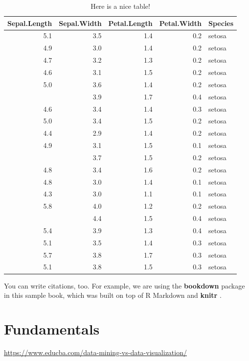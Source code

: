 \documentclass[]{book}
\theoremstyle{definition}
\theoremstyle{definition}
\theoremstyle{definition}
\theoremstyle{remark}
\begin{document}
\begin{table}

\caption{\label{tab:nice-tab}Here is a nice table!}
\centering
\begin{tabular}[t]{rrrrl}
\toprule
Sepal.Length & Sepal.Width & Petal.Length & Petal.Width & Species\\
\midrule
5.1 & 3.5 & 1.4 & 0.2 & setosa\\
4.9 & 3.0 & 1.4 & 0.2 & setosa\\
4.7 & 3.2 & 1.3 & 0.2 & setosa\\
4.6 & 3.1 & 1.5 & 0.2 & setosa\\
5.0 & 3.6 & 1.4 & 0.2 & setosa\\
\addlinespace
5.4 & 3.9 & 1.7 & 0.4 & setosa\\
4.6 & 3.4 & 1.4 & 0.3 & setosa\\
5.0 & 3.4 & 1.5 & 0.2 & setosa\\
4.4 & 2.9 & 1.4 & 0.2 & setosa\\
4.9 & 3.1 & 1.5 & 0.1 & setosa\\
\addlinespace
5.4 & 3.7 & 1.5 & 0.2 & setosa\\
4.8 & 3.4 & 1.6 & 0.2 & setosa\\
4.8 & 3.0 & 1.4 & 0.1 & setosa\\
4.3 & 3.0 & 1.1 & 0.1 & setosa\\
5.8 & 4.0 & 1.2 & 0.2 & setosa\\
\addlinespace
5.7 & 4.4 & 1.5 & 0.4 & setosa\\
5.4 & 3.9 & 1.3 & 0.4 & setosa\\
5.1 & 3.5 & 1.4 & 0.3 & setosa\\
5.7 & 3.8 & 1.7 & 0.3 & setosa\\
5.1 & 3.8 & 1.5 & 0.3 & setosa\\
\bottomrule
\end{tabular}
\end{table}

You can write citations, too. For example, we are using the
\textbf{bookdown} package \citep{R-bookdown} in this sample book, which
was built on top of R Markdown and \textbf{knitr} \citep{xie2015}.

\chapter{Fundamentals}\label{fundamentals}

\url{https://www.educba.com/data-mining-vs-data-visualization/}
\end{document}
